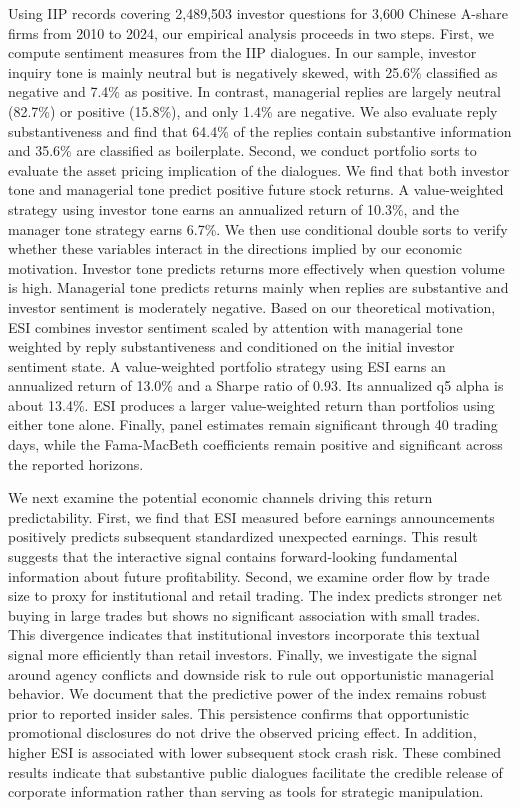 \documentclass[12pt]{article}
\begin{document}
Using IIP records covering 2,489,503 investor questions for 3,600 Chinese A-share firms from 2010 to 2024, our empirical analysis proceeds in two steps. First, we compute sentiment measures from the IIP dialogues. In our sample, investor inquiry tone is mainly neutral but is negatively skewed, with 25.6\% classified as negative and 7.4\% as positive. In contrast, managerial replies are largely neutral (82.7\%) or positive (15.8\%), and only 1.4\% are negative. We also evaluate reply substantiveness and find that 64.4\% of the replies contain substantive information and 35.6\% are classified as boilerplate. Second, we conduct portfolio sorts to evaluate the asset pricing implication of the dialogues. We find that both investor tone and managerial tone predict positive future stock returns. A value-weighted strategy using investor tone earns an annualized return of 10.3\%, and the manager tone strategy earns 6.7\%. We then use conditional double sorts to verify whether these variables interact in the directions implied by our economic motivation. Investor tone predicts returns more effectively when question volume is high. Managerial tone predicts returns mainly when replies are substantive and investor sentiment is moderately negative. Based on our theoretical motivation, ESI combines investor sentiment scaled by attention with managerial tone weighted by reply substantiveness and conditioned on the initial investor sentiment state. A value-weighted portfolio strategy using ESI earns an annualized return of 13.0\% and a Sharpe ratio of 0.93. Its annualized q5 alpha is about 13.4\%. ESI produces a larger value-weighted return than portfolios using either tone alone. Finally, panel estimates remain significant through 40 trading days, while the Fama-MacBeth coefficients remain positive and significant across the reported horizons.

We next examine the potential economic channels driving this return predictability. First, we find that ESI measured before earnings announcements positively predicts subsequent standardized unexpected earnings. This result suggests that the interactive signal contains forward-looking fundamental information about future profitability. Second, we examine order flow by trade size to proxy for institutional and retail trading. The index predicts stronger net buying in large trades but shows no significant association with small trades. This divergence indicates that institutional investors incorporate this textual signal more efficiently than retail investors. Finally, we investigate the signal around agency conflicts and downside risk to rule out opportunistic managerial behavior. We document that the predictive power of the index remains robust prior to reported insider sales. This persistence confirms that opportunistic promotional disclosures do not drive the observed pricing effect. In addition, higher ESI is associated with lower subsequent stock crash risk. These combined results indicate that substantive public dialogues facilitate the credible release of corporate information rather than serving as tools for strategic manipulation.
\end{document}
